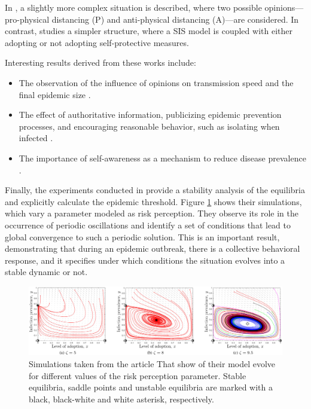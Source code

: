In \cite{Peng2021}, a slightly more complex situation is described, where two possible opinions—pro-physical distancing (P) and anti-physical distancing (A)—are considered. In contrast, \cite{Frieswijk_2022} studies a simpler structure, where a SIS model is coupled with either adopting or not adopting self-protective measures.

Interesting results derived from these works include: 
\begin{itemize} 
	\item The observation of the influence of opinions on transmission speed and the final epidemic size \cite{Peng2021}. 
	\item The effect of authoritative information, publicizing epidemic prevention processes, and encouraging reasonable behavior, such as isolating when infected \cite{Zuo_2021}. 
	\item The importance of self-awareness as a mechanism to reduce disease prevalence \cite{Silva2019}. 
\end{itemize}

Finally, the experiments conducted in \cite{Frieswijk_2022} provide a stability analysis of the equilibria and explicitly calculate the epidemic threshold. Figure \ref{fig:stability_friesjiw} shows their simulations, which vary a parameter modeled as risk perception. They observe its role in the occurrence of periodic oscillations and identify a set of conditions that lead to global convergence to such a periodic solution. This is an important result, demonstrating that during an epidemic outbreak, there is a collective behavioral response, and it specifies under which conditions the situation evolves into a stable dynamic or not.

\begin{figure}[h]
	\centering
	\includegraphics[width=0.95\linewidth]{0_introduction/images_review/stable_unstable_equilibria_friejs}
	\caption[Stability analysis of epi-behavior model]{Simulations taken from the article \cite{Frieswijk_2022} That show of their model evolve for different values of the risk perception parameter. Stable equilibria, saddle points and unstable equilibria are marked with a black, black-white and white asterisk, respectively.}
	\label{fig:stability_friesjiw}
\end{figure}

